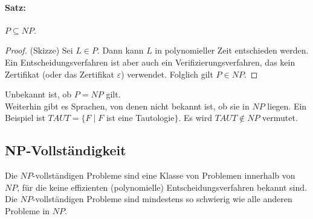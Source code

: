 \documentclass{scrreprt}
\begin{document}
\paragraph{Satz:} $P \subseteq NP$.
\begin{proof}
(Skizze) Sei $L \in P$. Dann kann $L$ in polynomieller Zeit entschieden werden. Ein Entscheidungsverfahren ist aber auch ein Verifizierungsverfahren, das kein Zertifikat (oder das Zertifikat $\varepsilon$) verwendet. Folglich gilt $P \in NP$.
\end{proof}
Unbekannt ist, ob $P=NP$ gilt.\\
Weiterhin gibt es Sprachen, von denen nicht bekannt ist, ob sie in $NP$ liegen. Ein Beispiel ist $TAUT=\{F\;|\; F$ ist eine Tautologie$\}$. Es wird $TAUT \not \in NP$ vermutet.

\subsection{NP-Vollständigkeit}
Die $NP$-vollständigen Probleme sind eine Klasse von Problemen innerhalb von $NP$, für die keine effizienten (polynomielle) Entscheidungsverfahren bekannt sind. Die $NP$-vollständigen Probleme sind mindestens so schwierig wie alle anderen Probleme in $NP$.
\end{document}
